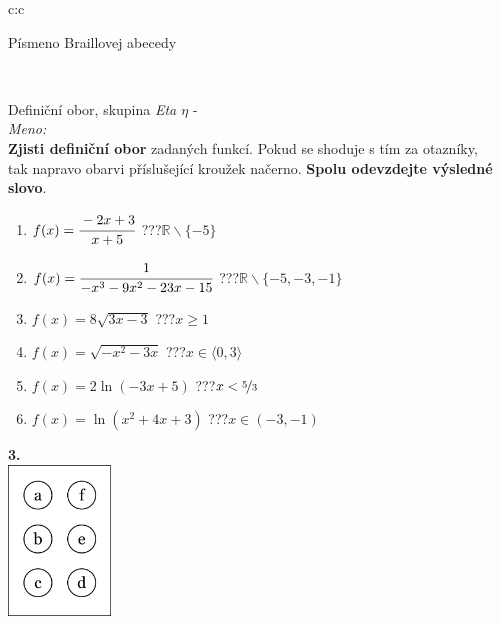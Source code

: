 \documentclass[10pt]{report}
\begin{document}
\begin{tabular}{c:c}
\begin{minipage}[c][99mm][t]{0.49\linewidth}
\begin{center}
\begin{minipage}{0.20\linewidth}
\begin{center}
{\small Písmeno Braillovej abecedy}
\end{center}
\end{minipage}
\end{center}
\end{minipage}
\\ \hdashline
\begin{minipage}[c][99mm][t]{0.49\linewidth}
\begin{center}
\vspace{7mm}
{\huge Definiční obor, skupina \textit{Eta $\eta$} -}\\[4.5mm]
\textit{Meno:}\phantom{xxxxxxxxxxxxxxxxxxxxxxxxxxxxxxxxxxxxxxxxxxxxxxxxxxxxxxxxxxxxxxxxx}\\[3.5mm]
\textbf{Zjisti definiční obor} zadaných funkcí. Pokud se shoduje s tím za otazníky,\\tak napravo obarvi příslušející kroužek načerno. \textbf{Spolu odevzdejte výsledné slovo}.\\[3mm]
\begin{minipage}{0.77\linewidth}
\begin{center}
\begin{varwidth}{\textwidth}
\begin{enumerate}
\normalsize
\item $f(x)=\cfrac{-2x+3}{x+5}$\quad \dotfill\; ???\;\dotfill \quad $\mathbb{R}\smallsetminus\{-5\}$
\item $f(x)=\cfrac{1}{-x^3-9x^2-23x-15}$\quad \dotfill\; ???\;\dotfill \quad $\mathbb{R}\smallsetminus\{-5,-3,-1\}$
\item $f(x)=8\sqrt{3x-3}$\quad \dotfill\; ???\;\dotfill \quad $x\geq1$
\item $f(x)=\sqrt{-x^2-3x}$\quad \dotfill\; ???\;\dotfill \quad $x\in\langle0 , 3\rangle$
\item $f(x)=2\ln{(-3x+5)}$\quad \dotfill\; ???\;\dotfill \quad $x<\nicefrac{5}{3}$
\item $f(x)=\ln{(x^2+4x+3)}$\quad \dotfill\; ???\;\dotfill \quad $x\in(-3 , -1)$
\end{enumerate}
\end{varwidth}
\end{center}
\end{minipage}
\begin{minipage}{0.20\linewidth}
\begin{center}
{\Huge\bfseries 3.} \\[2mm]
\includegraphics[height=40mm]{../images/braille.png}

\end{center}
\end{minipage}
\end{center}
\end{minipage}
\end{tabular}
\end{document}
